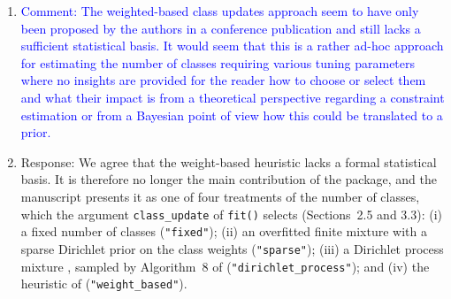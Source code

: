 \documentclass[12pt,a4paper]{article}
\begin{document}
\begin{enumerate}
    The latent class functionality is now discussed in detail in Sections~2.5,
    3.2, and 3.3 (see our responses to the next three comments). The application
    in Section~5.4 now uses the \texttt{Electricity} data, for which a single
    normal mixing distribution cannot represent a skewed or multimodal valuation
    of a local supplier. The Dirichlet process mixture and the sparse finite
    mixture infer the number of occupied classes, and
    \texttt{latent\_class\_diagnostics()} reports its posterior distribution.
    The weight-based heuristic is demonstrated on simulated data with a trimodal
    mixing distribution (Figure~5). Further applications cover a stated choice
    experiment on train trips (Sections~3.5, 4, 5.3, 7.3, and 8), the
    \texttt{Health} data for ordered responses (Sections~6.1 and 7.2), the
    \texttt{Game} data for ranked responses (Section~6.2), and Berserk decisions
    in an online chess tournament for conditional predictions (Section~7.1).
    \item \textcolor{blue}{Comment: The weighted-based class updates approach
    seem to have only been proposed by the authors in a conference publication
    and still lacks a sufficient statistical basis. It would seem that this is
    a rather ad-hoc approach for estimating the number of classes requiring
    various tuning parameters where no insights are provided for the reader
    how to choose or select them and what their impact is from a theoretical
    perspective regarding a constraint estimation or from a Bayesian point of
    view how this could be translated to a prior.}
    \item[] Response: We agree that the weight-based heuristic lacks a formal
    statistical basis. It is therefore no longer the main contribution of the
    package, and the manuscript presents it as one of four treatments of the
    number of classes, which the argument \texttt{class\_update} of
    \texttt{fit()} selects (Sections~2.5 and 3.3): (i) a fixed number of classes
    (\texttt{"fixed"}); (ii) an overfitted finite mixture with a sparse
    Dirichlet prior on the class weights
    \parencite{Rousseau2011,MalsinerWalli2016,FruehwirthSchnatter2019}
    (\texttt{"sparse"}); (iii) a Dirichlet process mixture
    \parencite{Escobar1995}, sampled by Algorithm~8 of \textcite{Neal2000}
    (\texttt{"dirichlet\_process"}); and (iv) the heuristic of
    \textcite{Oelschlaeger2021} (\texttt{"weight\_based"}).


\end{enumerate}
\end{document}
